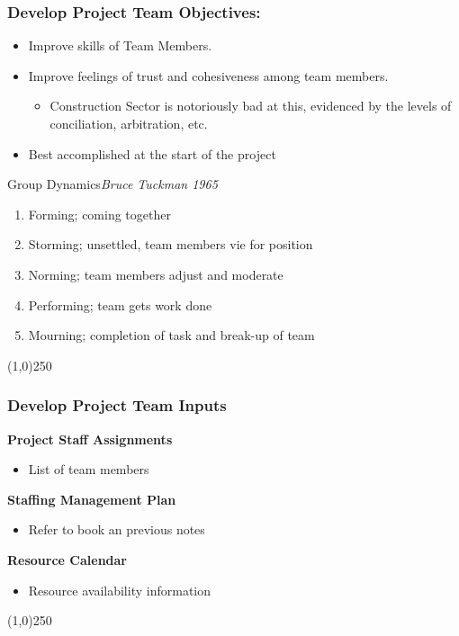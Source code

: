 \begin{frame}
\frametitle{Develop Project Team \hfill Objectives:}
\begin{itemize}
	\item Improve skills of Team Members.
	\item Improve feelings of trust and cohesiveness among team members.
			\begin{itemize}
				\item Construction Sector is notoriously bad at this, evidenced by the levels of conciliation, arbitration, etc.
			\end{itemize}
	\item Best accomplished at the start of the project
\end{itemize}

\begin{block}{Group Dynamics\hfill\textit{Bruce Tuckman 1965}}
	\begin{enumerate}
		\item Forming; coming together
		\item Storming; unsettled, team members vie for position
		\item Norming; team members adjust and moderate
		\item Performing; team gets work done
		\item Mourning; completion of task and break-up of team
	\end{enumerate}
\end{block}
\end{frame}\begin{center}\line(1,0){250}\end{center}


\begin{frame}
\frametitle{Develop Project Team \hfill Inputs}
\textbf{Project Staff Assignments}
\begin{itemize}
	\item List of team members
\end{itemize}
\textbf{Staffing Management Plan}
\begin{itemize}
	\item Refer to book an previous notes
\end{itemize}
\textbf{Resource Calendar}
\begin{itemize}
	\item Resource availability information
\end{itemize}
\end{frame}\begin{center}\line(1,0){250}\end{center}
 
